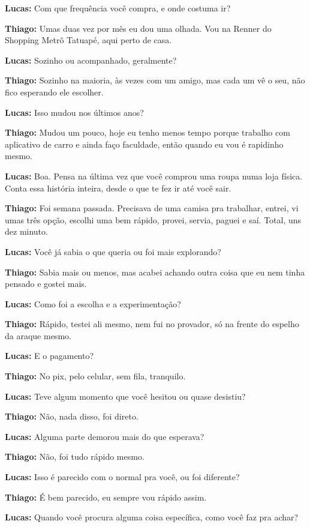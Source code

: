 \textbf{Lucas:} Com que frequência você compra, e onde costuma ir?

\textbf{Thiago:} Umas duas vez por mês eu dou uma olhada. Vou na Renner do Shopping Metrô Tatuapé, aqui perto de casa.

\textbf{Lucas:} Sozinho ou acompanhado, geralmente?

\textbf{Thiago:} Sozinho na maioria, às vezes com um amigo, mas cada um vê o seu, não fico esperando ele escolher.

\textbf{Lucas:} Isso mudou nos últimos anos?

\textbf{Thiago:} Mudou um pouco, hoje eu tenho menos tempo porque trabalho com aplicativo de carro e ainda faço faculdade, então quando eu vou é rapidinho mesmo.

\textbf{Lucas:} Boa. Pensa na última vez que você comprou uma roupa numa loja física. Conta essa história inteira, desde o que te fez ir até você sair.

\textbf{Thiago:} Foi semana passada. Precisava de uma camisa pra trabalhar, entrei, vi umas três opção, escolhi uma bem rápido, provei, servia, paguei e saí. Total, uns dez minuto.

\textbf{Lucas:} Você já sabia o que queria ou foi mais explorando?

\textbf{Thiago:} Sabia mais ou menos, mas acabei achando outra coisa que eu nem tinha pensado e gostei mais.

\textbf{Lucas:} Como foi a escolha e a experimentação?

\textbf{Thiago:} Rápido, testei ali mesmo, nem fui no provador, só na frente do espelho da araque mesmo.

\textbf{Lucas:} E o pagamento?

\textbf{Thiago:} No pix, pelo celular, sem fila, tranquilo.

\textbf{Lucas:} Teve algum momento que você hesitou ou quase desistiu?

\textbf{Thiago:} Não, nada disso, foi direto.

\textbf{Lucas:} Alguma parte demorou mais do que esperava?

\textbf{Thiago:} Não, foi tudo rápido mesmo.

\textbf{Lucas:} Isso é parecido com o normal pra você, ou foi diferente?

\textbf{Thiago:} É bem parecido, eu sempre vou rápido assim.

\textbf{Lucas:} Quando você procura alguma coisa específica, como você faz pra achar?

